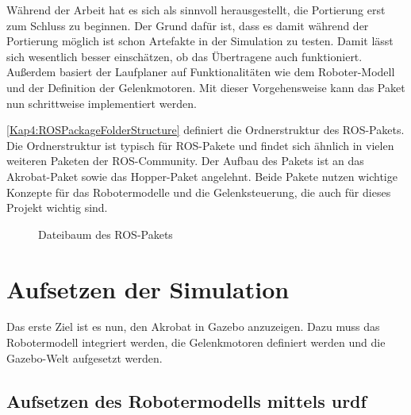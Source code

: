 \begin{itemize}
Während der Arbeit hat es sich als sinnvoll herausgestellt, die Portierung erst zum Schluss zu beginnen. Der Grund dafür ist, dass es damit während der Portierung möglich ist schon Artefakte in der Simulation zu testen. Damit lässt sich wesentlich besser einschätzen, ob das Übertragene auch funktioniert. Außerdem basiert der Laufplaner auf Funktionalitäten wie dem Roboter-Modell und der Definition der Gelenkmotoren. Mit dieser Vorgehensweise kann das Paket nun schrittweise implementiert werden.

\autoref{Kap4:ROSPackageFolderStructure} definiert die Ordnerstruktur des \ac{ROS}-Pakets. Die Ordnerstruktur ist typisch für \ac{ROS}-Pakete und findet sich ähnlich in vielen weiteren Paketen der \ac{ROS}-Community. Der Aufbau des Pakets ist an das Akrobat-Paket \autocite{akrobat} sowie das Hopper-Paket \autocite{hopper} angelehnt. Beide Pakete nutzen wichtige Konzepte für das Robotermodelle und die Gelenksteuerung, die auch für dieses Projekt wichtig sind.

\begin{figure}[p!]
\caption{Dateibaum des ROS-Pakets}
\label{Kap4:ROSPackageFolderStructure}
\end{figure}

\section{Aufsetzen der Simulation}

Das erste Ziel ist es nun, den Akrobat in Gazebo anzuzeigen. Dazu muss das Robotermodell integriert werden, die Gelenkmotoren definiert werden und die Gazebo-Welt aufgesetzt werden.

\subsection{Aufsetzen des Robotermodells mittels urdf}


\end{itemize}
